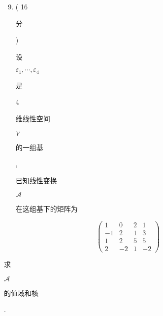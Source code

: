 \documentclass[10pt]{article}
\begin{document}
\begin{enumerate}
  \setcounter{enumi}{8}
  \item ( 16 \begin{CJK}{UTF8}{mj}分\end{CJK}) \begin{CJK}{UTF8}{mj}设\end{CJK} $\varepsilon_{1}, \cdots, \varepsilon_{4}$ \begin{CJK}{UTF8}{mj}是\end{CJK} 4 \begin{CJK}{UTF8}{mj}维线性空间\end{CJK} $V$ \begin{CJK}{UTF8}{mj}的一组基\end{CJK}, \begin{CJK}{UTF8}{mj}已知线性变换\end{CJK} $\mathcal{A}$ \begin{CJK}{UTF8}{mj}在这组基下的矩阵为\end{CJK}
\end{enumerate}
$$
\left(\begin{array}{cccc}
1 & 0 & 2 & 1 \\
-1 & 2 & 1 & 3 \\
1 & 2 & 5 & 5 \\
2 & -2 & 1 & -2
\end{array}\right)
$$
\begin{CJK}{UTF8}{mj}求\end{CJK} $\mathcal{A}$ \begin{CJK}{UTF8}{mj}的值域和核\end{CJK}.
\end{document}
